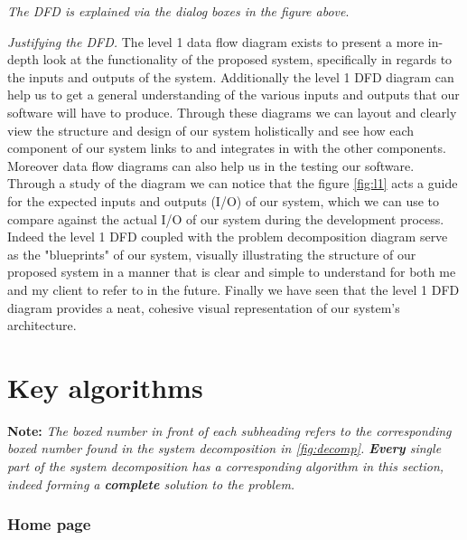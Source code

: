 \textit{The DFD is explained via the dialog boxes in
the figure above}.\\ \vspace{0.2cm}

\textit{Justifying the DFD.} The level 1 data flow diagram
exists to present a more in-depth look at the functionality of
the proposed system, specifically in regards to the inputs and
outputs of the system. Additionally the level 1 DFD diagram can help
us to get a general understanding of the various inputs and
outputs that our software will have to produce. Through these
diagrams we can layout and clearly view the structure and
design of our system holistically and see how each component
of our system links to and integrates in with the other components.
Moreover data flow diagrams can also help us in the testing our
software. Through a study of the diagram we can notice that the
figure \ref{fig:l1} acts a guide for the expected inputs and
outputs (I/O) of our system, which we can use to compare against
the actual I/O of our system during the development process.
Indeed the level 1 DFD coupled with the problem decomposition
diagram serve as the "blueprints" of our system, visually
illustrating the structure of our proposed system in a manner
that is clear and simple to understand for both me and my client
to refer to in the future.
Finally we have seen that the level 1 DFD diagram provides a
neat, cohesive visual representation of our system's architecture.

\section{Key algorithms}
\label{sec:algos}



\textbf{Note:} \textit{The boxed number in front of each subheading
refers to the corresponding boxed number found in the system decomposition
in \ref{fig:decomp}. \textbf{Every} single part of the system decomposition
has a corresponding algorithm in this section, indeed forming a \textbf{complete}
solution to the problem.}

\subsubsection{ Home page}

